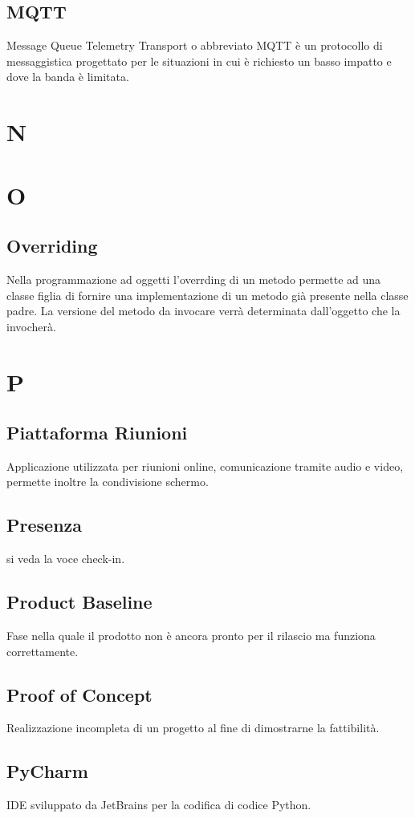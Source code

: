 \subsection{MQTT}
Message Queue Telemetry Transport o abbreviato MQTT è un protocollo di messaggistica progettato per le situazioni in cui è richiesto
un basso impatto e dove la banda è limitata.
\newpage
\section{N}
\section{O}
\subsection{Overriding}
Nella programmazione ad oggetti l'overrding di un metodo permette ad una classe figlia di fornire una implementazione di un metodo già presente nella classe padre.
La versione del metodo da invocare verrà determinata dall'oggetto che la invocherà.
\section{P}
\subsection{Piattaforma Riunioni}
Applicazione utilizzata per riunioni online, comunicazione tramite audio e video, permette inoltre la condivisione schermo.
\subsection{Presenza}
si veda la voce check-in. 
\subsection{Product Baseline}
Fase nella quale il prodotto non è ancora pronto per il rilascio ma funziona correttamente.
\subsection{Proof of Concept}
Realizzazione incompleta di un progetto al fine di dimostrarne la fattibilità.
\subsection{PyCharm}
IDE sviluppato da JetBrains per la codifica di codice Python.
